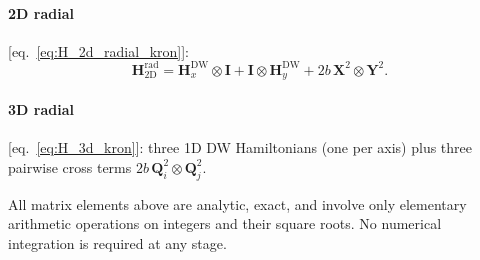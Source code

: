 \paragraph{2D radial} [eq.~\eqref{eq:H_2d_radial_kron}]:
\begin{equation*}
    \mathbf{H}_\mathrm{2D}^\mathrm{rad}
    = \mathbf{H}_x^\mathrm{DW} \otimes \mathbf{I}
    + \mathbf{I} \otimes \mathbf{H}_y^\mathrm{DW}
    + 2b\,\mathbf{X}^2 \otimes \mathbf{Y}^2.
\end{equation*}

\paragraph{3D radial} [eq.~\eqref{eq:H_3d_kron}]:
three 1D DW Hamiltonians (one per axis) plus three pairwise cross terms
$2b\,\mathbf{Q}_i^2\otimes\mathbf{Q}_j^2$.

\medskip
\noindent All matrix elements above are analytic, exact, and involve only
elementary arithmetic operations on integers and their square roots.  No
numerical integration is required at any stage.

